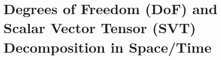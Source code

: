 % 


\section{Degrees of Freedom (DoF) and Scalar Vector Tensor (SVT) Decomposition in Space/Time}

